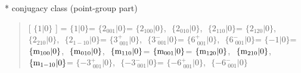 \documentclass[fleqn,10pt,landscape]{jsarticle}
\begin{document}
* conjugacy class (point-group part)
\begin{quote}
[ $\{1|0\}$ ] = \quad $\{1|0\}$\newline[ $\{2{}_{001}|0\}$ ] = \quad $\{2{}_{001}|0\}$\newline[ $\{2{}_{100}|0\}$ ] = \quad $\{2{}_{100}|0\}$,\,\, $\{2{}_{010}|0\}$,\,\, $\{2{}_{110}|0\}$\newline[ $\{2{}_{120}|0\}$ ] = \quad $\{2{}_{120}|0\}$,\,\, $\{2{}_{210}|0\}$,\,\, $\{2{}_{1-10}|0\}$\newline[ $\{3^{+}_{\,\,001}|0\}$ ] = \quad $\{3^{+}_{\,\,001}|0\}$,\,\, $\{3^{-}_{\,\,001}|0\}$\newline[ $\{6^{+}_{\,\,001}|0\}$ ] = \quad $\{6^{+}_{\,\,001}|0\}$,\,\, $\{6^{-}_{\,\,001}|0\}$\newline[ $\{-1|0\}$ ] = \quad $\{-1|0\}$\newline[ $\{{\rm m}_{100}|0\}$ ] = \quad $\{{\rm m}_{100}|0\}$,\,\, $\{{\rm m}_{010}|0\}$,\,\, $\{{\rm m}_{110}|0\}$\newline[ $\{{\rm m}_{001}|0\}$ ] = \quad $\{{\rm m}_{001}|0\}$\newline[ $\{{\rm m}_{120}|0\}$ ] = \quad $\{{\rm m}_{120}|0\}$,\,\, $\{{\rm m}_{210}|0\}$,\,\, $\{{\rm m}_{1-10}|0\}$\newline[ $\{-3^{+}_{\,\,001}|0\}$ ] = \quad $\{-3^{+}_{\,\,001}|0\}$,\,\, $\{-3^{-}_{\,\,001}|0\}$\newline[ $\{-6^{+}_{\,\,001}|0\}$ ] = \quad $\{-6^{+}_{\,\,001}|0\}$,\,\, $\{-6^{-}_{\,\,001}|0\}$\newline
\end{quote}
\end{document}
